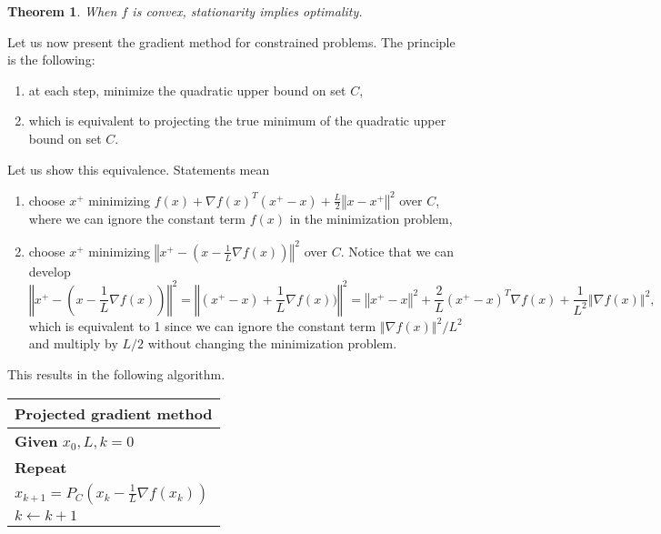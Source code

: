 \documentclass{article}
\newtheorem{theorem}{Theorem}
\theoremstyle{definition}
\newcommand{\vnorm}[1]{\left\Vert #1 \right\Vert}
\begin{document}
\begin{theorem}
When $f$ is convex, stationarity implies optimality.
\end{theorem}

Let us now present the gradient method for constrained problems. The principle is the following:
\begin{enumerate}
\item at each step, minimize the quadratic upper bound on set $C$,
\item which is equivalent to projecting the true minimum of the quadratic upper bound on set $C$.
\end{enumerate}
Let us show this equivalence. Statements mean
\begin{enumerate}
\item choose $x^+$ minimizing $f(x) + \nabla f(x)^T(x^+-x) + \frac{L}{2}{\vnorm{x-x^+}}^2$ over $C$, where we can ignore the constant term $f(x)$ in the minimization problem,
\item choose $x^+$ minimizing ${\vnorm{x^+ - (x - \frac{1}{L}\nabla f(x))}^2}$ over $C$. Notice that we can develop
\begin{equation*}
{\vnorm{x^+ - (x - \frac{1}{L}\nabla f(x))}^2} = {\vnorm{(x^+ - x) + \frac{1}{L}\nabla f(x))}^2} = \vnorm{x^+-x}^2 + \dfrac{2}{L}(x^+-x)^T \nabla f(x) + \dfrac{1}{L^2} \vnorm{\nabla f(x)}^2,
\end{equation*}
which is equivalent to 1 since we can ignore the constant term $\vnorm{\nabla f(x)}^2/L^2$ and multiply by $L/2$ without changing the minimization problem.
\end{enumerate}

This results in the following algorithm.
\begin{center}
\begin{tabular}{|l|}
\hline
Projected gradient method \\
\hline
\textbf{Given} $x_0,L,k=0$  \\
\textbf{Repeat} \\
\qquad $x_{k+1} = P_C(x_k - \frac{1}{L}\nabla f(x_k))$ \\
\qquad $k \leftarrow k+1$ \\
\hline
\end{tabular}
\end{center}
\end{document}
